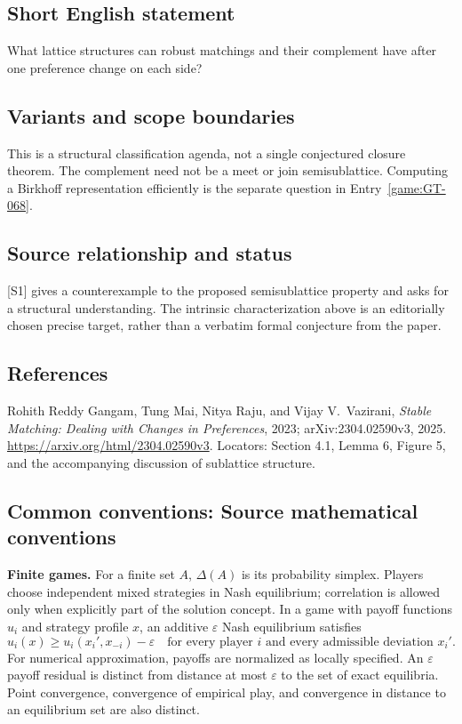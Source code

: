 \documentclass[11pt,a4paper]{article}
\begin{document}
\subsection*{Short English statement}
What lattice structures can robust matchings and their complement have
after one preference change on each side?

\subsection*{Variants and scope boundaries}
This is a structural classification agenda, not a single conjectured
closure theorem. The complement need not be a meet or join
semisublattice. Computing a Birkhoff representation efficiently is the
separate question in Entry~\ref{game:GT-068}.

\subsection*{Source relationship and status}
[S1] gives a counterexample to the proposed semisublattice property and
asks for a structural understanding. The intrinsic characterization
above is an editorially chosen precise target, rather than a verbatim
formal conjecture from the paper.

\subsection*{References}
\begingroup\footnotesize\raggedright
\noindent[S1] Rohith Reddy Gangam, Tung Mai, Nitya Raju, and
Vijay V.~Vazirani,
\emph{Stable Matching: Dealing with Changes in Preferences}, 2023;
arXiv:2304.02590v3, 2025.
\url{https://arxiv.org/html/2304.02590v3}.
Locators: Section 4.1, Lemma 6, Figure 5, and the accompanying
discussion of sublattice structure.
\par\endgroup

\subsection*{Common conventions: Source mathematical conventions}

\textbf{Finite games.} For a finite set $A$, $\Delta(A)$ is its probability
simplex. Players choose independent mixed strategies in Nash equilibrium;
correlation is allowed only when explicitly part of the solution concept.
In a game with payoff functions $u_i$ and strategy profile $x$, an additive
$\varepsilon$ Nash equilibrium satisfies
\[
 u_i(x)\geq u_i(x_i',x_{-i})-\varepsilon
 \quad\text{for every player $i$ and every admissible deviation $x_i'$}.
\]
For numerical approximation, payoffs are normalized as locally specified.
An $\varepsilon$ payoff residual is distinct from distance at most
$\varepsilon$ to the set of exact equilibria. Point convergence, convergence
of empirical play, and convergence in distance to an equilibrium set are
also distinct.
\end{document}
